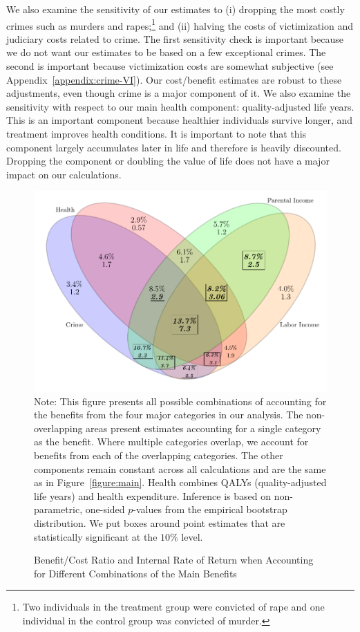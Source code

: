 We also examine the sensitivity of our estimates to (i) dropping the most costly crimes such as murders and rapes;\footnote{Two individuals in the treatment group were convicted of rape and one individual in the control group was convicted of murder.} and (ii) halving the costs of victimization and judiciary costs related to crime. The first sensitivity check is important because we do not want our estimates to be based on a few exceptional crimes. The second is important because victimization costs are somewhat subjective (see  Appendix~\ref{appendix:crime-VI}). Our cost/benefit estimates are robust to these adjustments, even though crime is a major component of it. We also examine the sensitivity with respect to our main health component: quality-adjusted life years. This is an important component because healthier individuals survive longer, and treatment improves health conditions. It is important to note that this component largely accumulates later in life and therefore is heavily discounted. Dropping the component or doubling the value of life does not have a major impact on our calculations.

\begin{figure}[!htbp]
\caption{Benefit/Cost Ratio and Internal Rate of Return when Accounting for Different Combinations of the Main Benefits}\label{figure:vennpooled}
\centering
\includegraphics[width=.7\columnwidth]{output/venn_pooled.pdf}
\footnotesize \justify
Note: This figure presents all possible combinations of accounting for the benefits from the four major categories in our analysis. The non-overlapping areas present estimates accounting for a single category as the benefit. Where multiple categories overlap, we account for benefits from each of the overlapping categories. The other components remain constant across all calculations and are the same as in Figure~\ref{figure:main}. Health combines QALYs (quality-adjusted life years) and health expenditure. Inference is based on non-parametric, one-sided $p$-values from the empirical bootstrap distribution. We put boxes around point estimates that are statistically significant at the $10\%$ level.
\end{figure}

